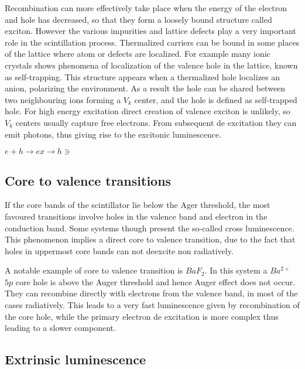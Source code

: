 Recombination can more effectively take place when the energy of the electron and hole has decreased, so that they form a loosely bound structure called exciton. 
However the various impurities and lattice defects play a very important role in the scintillation process. Thermalized carriers can be bound in some places of the lattice where atom or defects are localized. 
For example many ionic crystals shows phenomena of localization of the valence hole in the lattice, known as self-trapping. This structure appears when a thermalized hole localizes an anion, polarizing the environment. As a result the hole can be shared between two neighbouring ions forming a $V_{k}$ center, and the hole is defined as self-trapped hole. For high energy excitation direct creation of valence exciton is unlikely, so $V_{k}$ centers usually capture free electrons. From subsequent de excitation they can emit photons, thus giving rise to the excitonic luminescence.
 
$e + h \rightarrow ex \rightarrow h\ni$

\subsection{Core to valence transitions}

If the core bands of the scintillator lie below the Ager threshold, the most favoured transitions involve holes in the valence band and electron in the conduction band. Some systems though present the so-called cross luminescence. This phenomenon implies a direct core to valence transition, due to the fact that holes in uppermost core bands can not deexcite non radiatively\cite{Lecoq2006}. 

A notable example of core to valence transition is $BaF_{2}$. In this system a $Ba^{2+}$ $5p$ core hole is above the Auger threshold and hence Auger effect does not occur. They can recombine directly with electrons from the valence band, in most of the cases radiatively.
This leads to a very fast luminescence given by recombination of the core hole, while the primary electron de excitation is more complex thus leading to a slower component.


\subsection{Extrinsic luminescence}


